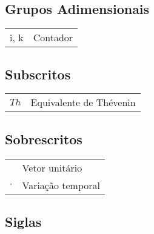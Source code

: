 \subsection*{Grupos Adimensionais}

\begin{tabular}{p{}p{}}
i, k    &   Contador    \tabularnewline
\end{tabular}


\subsection*{Subscritos}

\begin{tabular}{p{}p{}}
$Th$    & Equivalente de Thévenin   \tabularnewline
\end{tabular}


\subsection*{Sobrescritos}

\begin{tabular}{p{}p{}}
$\hat{}$    & Vetor unitário    \tabularnewline
$\cdot$     & Variação temporal \tabularnewline
\end{tabular}


\subsection*{Siglas}

